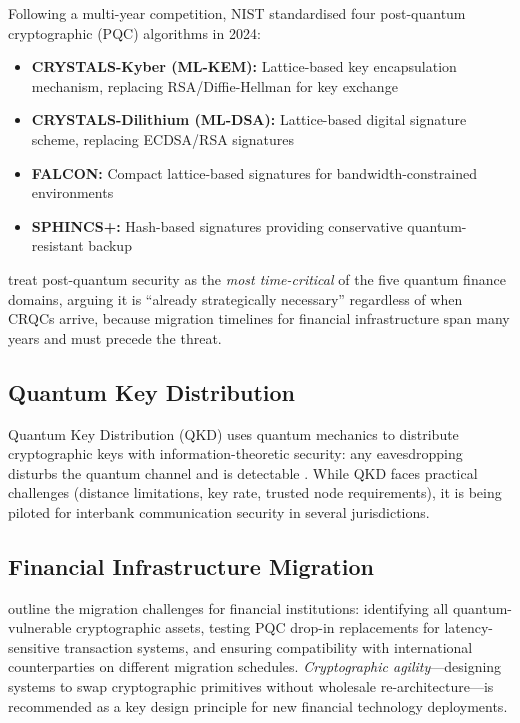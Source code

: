 \documentclass[12pt,a4paper]{article}
\begin{document}
Following a multi-year competition, NIST standardised four post-quantum cryptographic (PQC) algorithms in 2024:
\begin{itemize}[noitemsep]
    \item \textbf{CRYSTALS-Kyber (ML-KEM):} Lattice-based key encapsulation mechanism, replacing RSA/Diffie-Hellman for key exchange
    \item \textbf{CRYSTALS-Dilithium (ML-DSA):} Lattice-based digital signature scheme, replacing ECDSA/RSA signatures
    \item \textbf{FALCON:} Compact lattice-based signatures for bandwidth-constrained environments
    \item \textbf{SPHINCS+:} Hash-based signatures providing conservative quantum-resistant backup
\end{itemize}

\citet{gong_quantum_2026-1} treat post-quantum security as the \emph{most time-critical} of the five quantum finance domains, arguing it is ``already strategically necessary'' regardless of when CRQCs arrive, because migration timelines for financial infrastructure span many years and must precede the threat.

\subsection{Quantum Key Distribution}

Quantum Key Distribution (QKD) uses quantum mechanics to distribute cryptographic keys with information-theoretic security: any eavesdropping disturbs the quantum channel and is detectable \citep{gong_quantum_2026-1, pathak_evolution_2025}. While QKD faces practical challenges (distance limitations, key rate, trusted node requirements), it is being piloted for interbank communication security in several jurisdictions.

\subsection{Financial Infrastructure Migration}

\citet{hollebeek_impact_nodate} outline the migration challenges for financial institutions: identifying all quantum-vulnerable cryptographic assets, testing PQC drop-in replacements for latency-sensitive transaction systems, and ensuring compatibility with international counterparties on different migration schedules. \emph{Cryptographic agility}---designing systems to swap cryptographic primitives without wholesale re-architecture---is recommended as a key design principle for new financial technology deployments.
\end{document}
